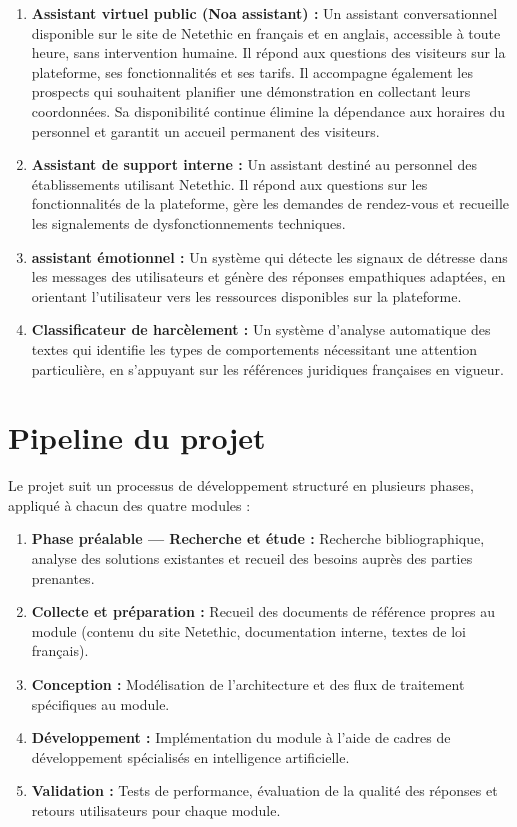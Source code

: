 \begin{enumerate}
    \item \textbf{Assistant virtuel public (Noa assistant) :} Un assistant conversationnel disponible sur le site de Netethic en français et en anglais, accessible à toute heure, sans intervention humaine.
          Il répond aux questions des visiteurs sur la plateforme, ses fonctionnalités et ses tarifs.
          Il accompagne également les prospects qui souhaitent planifier une démonstration en collectant leurs coordonnées.
          Sa disponibilité continue élimine la dépendance aux horaires du personnel et garantit un accueil permanent des visiteurs.
    \item \textbf{Assistant de support interne :} Un assistant destiné au personnel des établissements utilisant Netethic.
          Il répond aux questions sur les fonctionnalités de la plateforme, gère les demandes de rendez-vous et recueille les signalements de dysfonctionnements techniques.
    \item \textbf{assistant émotionnel :} Un système qui détecte les signaux de détresse dans les messages des utilisateurs et génère des réponses empathiques adaptées, en orientant l'utilisateur vers les ressources disponibles sur la plateforme.
    \item \textbf{Classificateur de harcèlement :} Un système d'analyse automatique des textes qui identifie les types de comportements nécessitant une attention particulière, en s'appuyant sur les références juridiques françaises en vigueur.
\end{enumerate}

\section{Pipeline du projet}

Le projet suit un processus de développement structuré en plusieurs phases, appliqué à chacun des quatre modules :

\begin{enumerate}
    \item \textbf{Phase préalable — Recherche et étude :} Recherche bibliographique, analyse des solutions existantes et recueil des besoins auprès des parties prenantes.
    \item \textbf{Collecte et préparation :} Recueil des documents de référence propres au module (contenu du site Netethic, documentation interne, textes de loi français).
    \item \textbf{Conception :} Modélisation de l'architecture et des flux de traitement spécifiques au module.
    \item \textbf{Développement :} Implémentation du module à l'aide de cadres de développement spécialisés en intelligence artificielle.
    \item \textbf{Validation :} Tests de performance, évaluation de la qualité des réponses et retours utilisateurs pour chaque module.
\end{enumerate}

